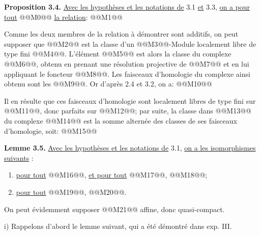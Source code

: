 
\textbf{Proposition 3.4.} \uline{Avec les hypothèses et les notations de} 3.1 \uline{et} 3.3, \uline{on a pour tout} @@M0@@ \uline{la relation}:
@@M1@@

Comme les deux membres de la relation à démontrer sont additifs, on peut supposer que @@M2@@ est la classe d'un @@M3@@-Module localement libre de type fini @@M4@@. L'élément @@M5@@ est alors la classe du complexe @@M6@@, obtenu en prenant une résolution projective de @@M7@@ et en lui appliquant le foncteur @@M8@@. Les faisceaux d'homologie du complexe ainsi obtenu sont les @@M9@@. Or d'après 2.4 et 3.2, on a:
@@M10@@

Il en résulte que ces faisceaux d'homologie sont localement libres de type fini sur @@M11@@, donc parfaits sur @@M12@@; par suite, la classe dans @@M13@@ du complexe @@M14@@ est la somme alternée des classes de ses faisceaux d'homologie, soit:
@@M15@@

\textbf{Lemme 3.5.} \uline{Avec les hypothèses et les notations de} 3.1, \uline{on a les isomorphismes suivants} :
\begin{enumerate}[label=\roman*)]
\item \uline{pour tout} @@M16@@, \uline{et pour tout} @@M17@@, @@M18@@;
\item \uline{pour tout} @@M19@@, @@M20@@.
\end{enumerate}

On peut évidemment supposer @@M21@@ affine, donc quasi-compact.

i) Rappelons d'abord le lemme suivant, qui a été démontré dans exp. III.

